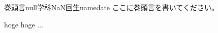 \documentclass[10pt,b5paper,papersize,dvipdfmx]{jsbook}
\begin{document}
\begin{preface}{巻頭言}{null学科NaN回生}{name}{date}
  ここに巻頭言を書いてください。\par
  hoge hoge ...
\end{preface}
\end{document}
